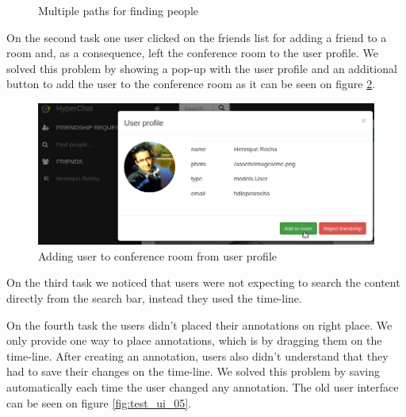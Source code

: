 \begin{figure}
    \caption{Multiple paths for finding people}
    \label{fig:test_ui_01_02_03}
\end{figure}

On the second task one user clicked on the friends list for adding a friend to a room and, as a consequence, left the conference room to the user profile. We solved this problem by showing a pop-up with the user profile and an additional button to add the user to the conference room as it can be seen on figure \ref{fig:test_ui_04}.

\begin{figure}
\centering
\begin{minipage}[b]{0.7\linewidth}
\centering

    \includegraphics[width=\textwidth]{figures/test_ui_04.png}
\end{minipage}


    \caption{Adding user to conference room from user profile}
    \label{fig:test_ui_04}
\end{figure}

On the third task we noticed that users were not expecting to search the content directly from the search bar, instead they used the time-line.

On the fourth task the users didn't placed their annotations on right place. We only provide one way to place annotations, which is by dragging them on the time-line. 
After creating an annotation, users also didn't understand that they had to save their changes on the time-line. We solved this problem by saving automatically each time the user changed any annotation. The old user interface can be seen on figure \ref{fig:test_ui_05}.

